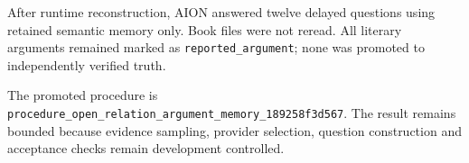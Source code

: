 After runtime reconstruction, AION answered twelve delayed questions using
retained semantic memory only.  Book files were not reread.  All literary
arguments remained marked as \texttt{reported\_argument}; none was promoted to
independently verified truth.

The promoted procedure is
\texttt{procedure\_open\_relation\_argument\_memory\_189258f3d567}.
The result remains bounded because evidence sampling, provider selection,
question construction and acceptance checks remain development controlled.
